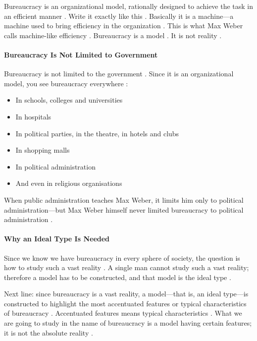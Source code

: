 \begin{KeyConcept}
Bureaucracy is an organizational model, rationally designed to achieve the task in an efficient manner . Write it exactly like this .
Basically it is a machine---a machine used to bring efficiency in the organization . This is what Max Weber calls machine-like efficiency .
Bureaucracy is a model . It is not reality .
\end{KeyConcept}

\paragraph{Bureaucracy Is Not Limited to Government}
Bureaucracy is not limited to the government . Since it is an organizational model, you see bureaucracy everywhere :
\begin{itemize}
    \item In schools, colleges and universities 
    \item In hospitals 
    \item In political parties, in the theatre, in hotels and clubs 
    \item In shopping malls 
    \item In political administration 
    \item And even in religious organisations 
\end{itemize}

\begin{CriticalPoint}
When public administration teaches Max Weber, it limits him only to political administration---but Max Weber himself never limited bureaucracy to political administration .
\end{CriticalPoint}

\paragraph{Why an Ideal Type Is Needed}
Since we know we have bureaucracy in every sphere of society, the question is how to study such a vast reality . A single man cannot study such a vast reality; therefore a model has to be constructed, and that model is the ideal type .

\begin{KeyConcept}
Next line: since bureaucracy is a vast reality, a model---that is, an ideal type---is constructed to highlight the most accentuated features or typical characteristics of bureaucracy .
Accentuated features means typical characteristics . What we are going to study in the name of bureaucracy is a model having certain features; it is not the absolute reality .
\end{KeyConcept}

